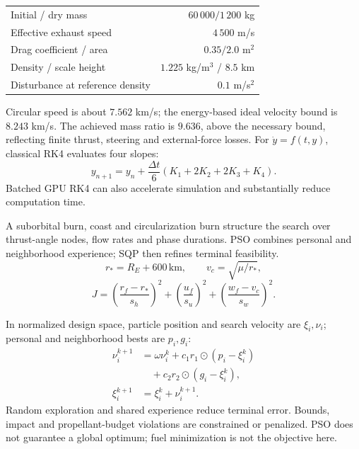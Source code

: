 \documentclass[10pt]{article}
\begin{document}
{\fontsize{9.2}{12}\selectfont
\begin{tabular*}{\linewidth}{@{\extracolsep{\fill}}lr@{}}\toprule
Initial / dry mass & $60\,000 / 1\,200$ kg\\
Effective exhaust speed & $4\,500$ m/s\\
Drag coefficient / area & $0.35 / 2.0$ m$^2$\\
Density / scale height & $1.225$ kg/m$^3$ / $8.5$ km\\
Disturbance at reference density & $0.1$ m/s$^2$\\\bottomrule
\end{tabular*}}
Circular speed is about $7.562$ km/s; the energy-based ideal velocity bound is $8.243$ km/s. The achieved mass ratio is $9.636$, above the necessary bound, reflecting finite thrust, steering and external-force losses.
For $\dot y=f(t,y)$, classical RK4 evaluates four slopes:
\[
 y_{n+1}=y_n+\frac{\Delta t}{6}(K_1+2K_2+2K_3+K_4).
\]
Batched GPU RK4 can also accelerate simulation and substantially reduce computation time.

\columnend\colsep
\columnstart
{}
A suborbital burn, coast and circularization burn structure the search over thrust-angle nodes, flow rates and phase durations. PSO combines personal and neighborhood experience; SQP then refines terminal feasibility.
\[
 r_*=R_E+600\,\mathrm{km},\qquad v_c=\sqrt{\mu/r_*},
\]
\[
 J=\left(\frac{r_f-r_*}{s_h}\right)^2+
 \left(\frac{u_f}{s_u}\right)^2+
 \left(\frac{w_f-v_c}{s_w}\right)^2.
\]

In normalized design space, particle position and search velocity are $\xi_i,\nu_i$; personal and neighborhood bests are $p_i,g_i$:
\[
\begin{aligned}
 \nu_i^{k+1}&=\omega\nu_i^k+c_1r_1\odot(p_i-\xi_i^k)\\
 &\quad+c_2r_2\odot(g_i-\xi_i^k),\\
 \xi_i^{k+1}&=\xi_i^k+\nu_i^{k+1}.
\end{aligned}
\]
Random exploration and shared experience reduce terminal error. Bounds, impact and propellant-budget violations are constrained or penalized. PSO does not guarantee a global optimum; fuel minimization is not the objective here.
\end{document}
